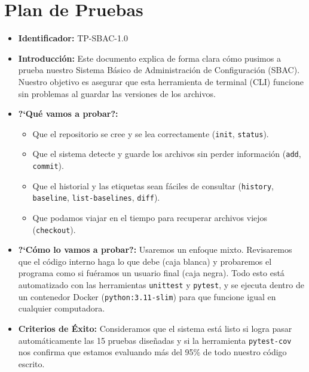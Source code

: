 \documentclass[12pt, letterpaper]{article}
\begin{document}
\section{Plan de Pruebas}
\begin{itemize}[leftmargin=*]
    \item \textbf{Identificador:} TP-SBAC-1.0
    \item \textbf{Introducción:} Este documento explica de forma clara cómo pusimos a prueba nuestro Sistema Básico de Administración de Configuración (SBAC). Nuestro objetivo es asegurar que esta herramienta de terminal (CLI) funcione sin problemas al guardar las versiones de los archivos.
    \item \textbf{?`Qué vamos a probar?:}
    \begin{itemize}
        \item Que el repositorio se cree y se lea correctamente (\texttt{init}, \texttt{status}).
        \item Que el sistema detecte y guarde los archivos sin perder información (\texttt{add}, \texttt{commit}).
        \item Que el historial y las etiquetas sean fáciles de consultar (\texttt{history}, \texttt{baseline}, \texttt{list-baselines}, \texttt{diff}).
        \item Que podamos viajar en el tiempo para recuperar archivos viejos (\texttt{checkout}).
    \end{itemize}
    \item \textbf{?`Cómo lo vamos a probar?:} Usaremos un enfoque mixto. Revisaremos que el código interno haga lo que debe (caja blanca) y probaremos el programa como si fuéramos un usuario final (caja negra). Todo esto está automatizado con las herramientas \texttt{unittest} y \texttt{pytest}, y se ejecuta dentro de un contenedor Docker (\texttt{python:3.11-slim}) para que funcione igual en cualquier computadora.
    \item \textbf{Criterios de Éxito:} Consideramos que el sistema está listo si logra pasar automáticamente las 15 pruebas diseñadas y si la herramienta \texttt{pytest-cov} nos confirma que estamos evaluando más del 95\% de todo nuestro código escrito.
\end{itemize}
\end{document}
